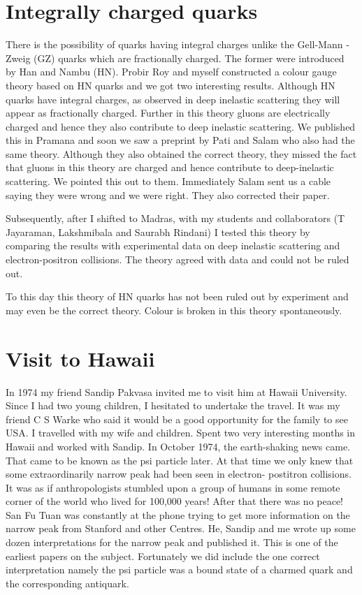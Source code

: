 \section*{Integrally charged quarks}

There is the possibility of quarks having integral charges unlike the 
Gell-Mann - Zweig (GZ) quarks which are fractionally charged. The former 
were introduced by Han and Nambu (HN). Probir Roy and myself constructed 
a colour gauge theory based on HN quarks and we got two interesting 
results. Although HN quarks have inte\-gral charges, as observed in deep 
inelastic scattering they will appear as fractionally charged. Further 
in this theory gluons are electrically charged and hence they also 
contribute to deep inelastic scattering. We published this in Pramana 
and soon we saw a preprint by Pati and Salam who also had the same 
theory. Although they also obtained the correct theory, they missed the 
fact that gluons in this theory are charged and hence contribute to 
deep-inelastic scattering. We pointed this out to them. Immedi\-ately 
Salam sent us a cable saying they were wrong and we were right. They 
also corrected their paper.

Subsequently, after I shifted to Madras, with my students and 
collaborators (T Jayaraman, Lakshmibala and Saurabh Rindani) I tested 
this theory by comparing the results with experi\-mental data on deep 
inelastic scattering and electron-positron collisions. The theory agreed 
with data and could not be ruled out.

To this day this theory of HN quarks has not been ruled out by 
experiment and may even be the correct theory. Colour is broken in this 
theory spontaneously.

\vspace{-\topsep}
\section*{Visit to Hawaii}

In 1974 my friend Sandip Pakvasa invited me to visit him at Ha\-waii 
University. Since I had two young children, I hesitated to undertake the 
travel. It was my friend C S Warke who said it would be a good 
opportunity for the family to see USA. I trave\-lled with my wife and 
children. Spent two very interesting mon\-ths in Hawaii and worked with 
Sandip. In October 1974, the earth-shaking news came. That came to be 
known as the psi particle later. At that time we only knew that some 
extraordinarily narrow peak had been seen in electron- postitron 
collisions. It was as if anthropologists stumbled upon a group of humans 
in some remote corner of the world who lived for 100,000 years! After 
that there was no peace! San Fu Tuan was constantly at the phone trying 
to get more information on the narrow peak from Stanford and other 
Centres. He, Sandip and me wrote up some dozen interpretations for the 
narrow peak and published it. This is one of the earliest papers on the 
subject. Fortunately we did include the one correct interpretation 
namely the psi particle was a bound state of a charmed quark and the 
corresponding antiquark.

